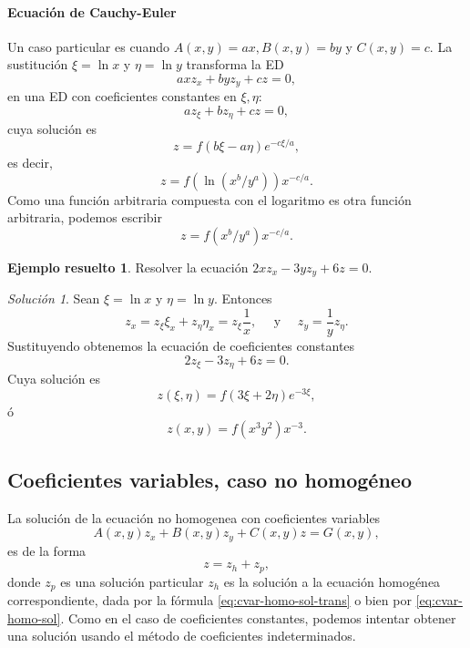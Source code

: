 \documentclass[11pt,letterpaper,draft]{report}
\theoremstyle{plain}
\theoremstyle{definition}
\newtheorem{solved}[theorem]{Ejemplo resuelto}
\theoremstyle{remark}
\newtheorem*{solution}{Solución}
\newcommand\<{\langle}
\renewcommand\>{\rangle}
\begin{document}
\paragraph{Ecuación de Cauchy-Euler}

Un caso particular es cuando $A(x,y) = ax, B(x,y) = by$ y
$C(x,y) = c$. La sustitución $\xi = \ln x$ y $\eta = \ln
y$ transforma la ED
\begin{equation}
  axz_x + byz_y + cz = 0
,\end{equation}
en una ED con coeficientes constantes en $\xi, \eta$:
\begin{equation}
  az_\xi + bz_\eta + cz = 0
,\end{equation}
cuya solución es
\begin{equation}
  z = f(b\xi-a\eta)e^{-c \xi/ a}
,\end{equation}
es decir,
\begin{equation}
  z = f(\ln (x^b / y^{a}))x^{-c / a}
.\end{equation}
Como una función arbitraria compuesta con el logaritmo es otra función
arbitraria, podemos escribir
\begin{equation}
  z = f(x^b / y^{a})x^{-c / a}
.\end{equation}

\begin{solved}
  Resolver la ecuación $2x z_x - 3yz_y + 6z = 0$.
  \begin{solution}
    Sean $\xi = \ln x$ y $\eta = \ln y$. Entonces
    \[
    z_x = z_\xi \xi_x + z_\eta \eta_x = z_\xi \frac{1}{x},
    \quad \text{ y } \quad z_y = \frac{1}{y} z_\eta.
    \] 
    Sustituyendo obtenemos la ecuación de coeficientes
    constantes
    \[
    2z_\xi - 3z_\eta + 6z = 0.
    \] 
    Cuya solución es
    \[
    z(\xi,\eta) = f(3\xi + 2\eta)e^{-3\xi},
    \] 
    ó
    \[
    z(x,y) = f(x^3y^2)x^{-3}.
    \] 
  \end{solution}
\end{solved}

\subsection{Coeficientes variables, caso no homogéneo}
\label{ssec:cvar-nohomo}

La solución de la ecuación no homogenea con coeficientes variables
\begin{equation}
  A(x,y)z_x + B(x,y)z_y + C(x,y)z = G(x,y)
,\end{equation}
es de la forma
\begin{equation}
  z = z_h + z_p
,\end{equation}
donde \(z_p\) es una solución particular \(z_h\) es la solución a la
ecuación homogénea correspondiente, dada por la fórmula
\eqref{eq:cvar-homo-sol-trans} o bien por \eqref{eq:cvar-homo-sol}.
Como en el caso de coeficientes constantes, podemos intentar obtener
una solución usando el método de coeficientes indeterminados.
\end{document}
